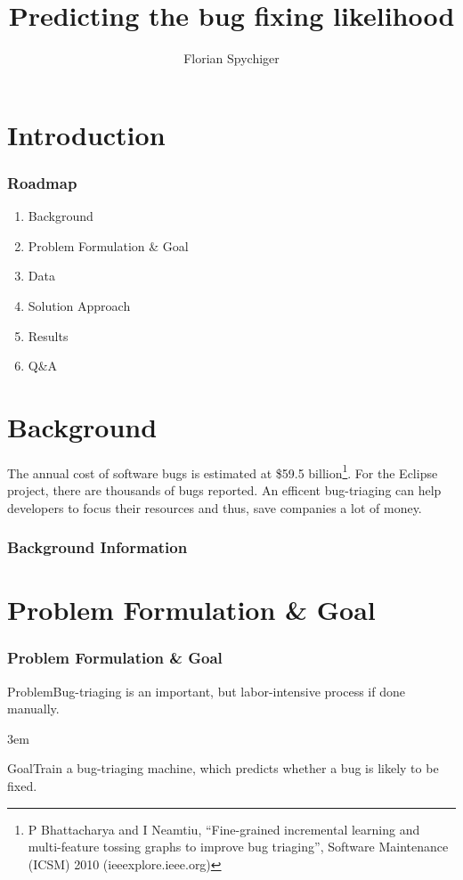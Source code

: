 \documentclass[xcolor=sgvnames,serifs,notes,compress,professionalfont]{beamer}
\begin{document}
	
\title{Predicting the bug fixing likelihood}
\author{Florian Spychiger}

\begin{frame}
	\titlepage
\end{frame}

\section{Introduction}
\begin{frame}
\frametitle{Roadmap}
	\begin{enumerate}
		\item Background
		\item Problem Formulation \& Goal
		\item Data
		\item Solution Approach
		\item Results
		\item Q\&A
	\end{enumerate}
\end{frame}

\section{Background}
\begin{frame}
The annual cost of software bugs is estimated at \$59.5 billion\footnote{P Bhattacharya and I Neamtiu, “Fine-­grained incremental learning and multi-­feature tossing graphs to improve bug triaging”, Software Maintenance (ICSM) 2010 (ieeexplore.ieee.org)}. For the Eclipse project, there are thousands of bugs reported. An efficent bug-triaging can help developers to focus their resources and thus, save companies a lot of money. 
\frametitle{Background Information}
\end{frame}

\section{Problem Formulation \& Goal}
\begin{frame}
\frametitle{Problem Formulation \& Goal}
\begin{alertblock}{Problem}Bug-triaging is an important, but labor-intensive process if done manually.\end{alertblock}
\kern 3em
\begin{block}{Goal}Train a bug-triaging machine, which predicts whether a bug is likely to be fixed.\end{block}
\end{frame}
\end{document}
